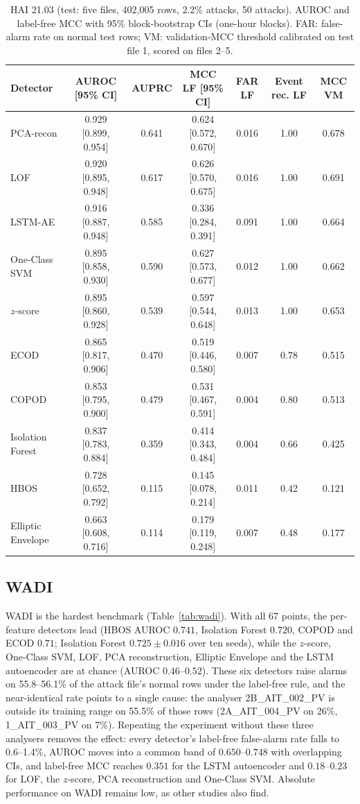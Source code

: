 \documentclass[11pt]{article}
\begin{document}
\begin{table}[t]
\centering\small
\caption{HAI 21.03 (test: five files, 402{,}005 rows, 2.2\% attacks, 50 attacks).
AUROC and label-free MCC with 95\% block-bootstrap CIs (one-hour blocks). FAR:
false-alarm rate on normal test rows; VM: validation-MCC threshold calibrated on test
file 1, scored on files 2--5.}
\label{tab:hai}
\begin{tabular}{lcccccc}
\toprule
Detector & AUROC [95\% CI] & AUPRC & MCC LF [95\% CI] & FAR LF & Event rec. LF & MCC VM \\
\midrule
PCA-recon & 0.929 [0.899, 0.954] & 0.641 & 0.624 [0.572, 0.670] & 0.016 & 1.00 & 0.678 \\
LOF & 0.920 [0.895, 0.948] & 0.617 & 0.626 [0.570, 0.675] & 0.016 & 1.00 & 0.691 \\
LSTM-AE & 0.916 [0.887, 0.948] & 0.585 & 0.336 [0.284, 0.391] & 0.091 & 1.00 & 0.664 \\
One-Class SVM & 0.895 [0.858, 0.930] & 0.590 & 0.627 [0.573, 0.677] & 0.012 & 1.00 & 0.662 \\
$z$-score & 0.895 [0.860, 0.928] & 0.539 & 0.597 [0.544, 0.648] & 0.013 & 1.00 & 0.653 \\
ECOD & 0.865 [0.817, 0.906] & 0.470 & 0.519 [0.446, 0.580] & 0.007 & 0.78 & 0.515 \\
COPOD & 0.853 [0.795, 0.900] & 0.479 & 0.531 [0.467, 0.591] & 0.004 & 0.80 & 0.513 \\
Isolation Forest & 0.837 [0.783, 0.884] & 0.359 & 0.414 [0.343, 0.484] & 0.004 & 0.66 & 0.425 \\
HBOS & 0.728 [0.652, 0.792] & 0.115 & 0.145 [0.078, 0.214] & 0.011 & 0.42 & 0.121 \\
Elliptic Envelope & 0.663 [0.608, 0.716] & 0.114 & 0.179 [0.119, 0.248] & 0.007 & 0.48 & 0.177 \\
\bottomrule
\end{tabular}
\end{table}

\subsection{WADI}
\label{sec:wadi}
WADI is the hardest benchmark (Table~\ref{tab:wadi}). With all 67 points, the
per-feature detectors lead (HBOS AUROC $0.741$, Isolation Forest $0.720$, COPOD and ECOD
$0.71$; Isolation Forest $0.725\pm0.016$ over ten seeds), while the $z$-score, One-Class
SVM, LOF, PCA reconstruction, Elliptic Envelope and the LSTM autoencoder are at chance
(AUROC $0.46$--$0.52$). These six detectors raise alarms on 55.8--56.1\% of the attack
file's normal rows under the label-free rule, and the near-identical rate points to a
single cause: the analyser 2B\_AIT\_002\_PV is outside its training range on 55.5\% of
those rows (2A\_AIT\_004\_PV on 26\%, 1\_AIT\_003\_PV on 7\%). Repeating the experiment
without these three analysers removes the effect: every detector's label-free false-alarm
rate falls to 0.6--1.4\%, AUROC moves into a common band of $0.650$--$0.748$ with
overlapping CIs, and label-free MCC reaches $0.351$ for the LSTM autoencoder and
$0.18$--$0.23$ for LOF, the $z$-score, PCA reconstruction and One-Class SVM. Absolute
performance on WADI remains low, as other studies also find.
\end{document}
